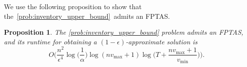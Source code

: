 \documentclass[mnsc,non-blindrev]{informs3}
\newtheorem{proposition}[theorem]{Proposition}
\theoremstyle{definition}
\begin{document}

We use the following proposition to show that the~\ref{prob:inventory_upper_bound}~admits an FPTAS.

\begin{proposition}\label{prop:upper_bound_fptas}
The \ref{prob:inventory_upper_bound} problem admits an FPTAS, and its runtime for obtaining a $(1-\epsilon)$-approximate solution is
\begin{equation*}
O\Big(\dfrac{n^2}{\epsilon^4}\log\Big(\dfrac{1}{\alpha}\Big)\log(nv_{\max}+1)\log\Big(T+\dfrac{nv_{\max}+1}{v_{\min}}\Big)\Big).
\end{equation*}
\end{proposition}
\end{document}
